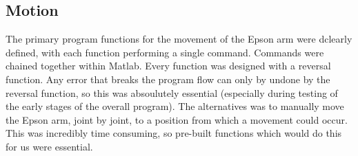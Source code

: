 \subsection{Motion}

The primary program functions for the movement of the Epson arm were dclearly defined, with each function performing a single command. Commands were chained together within Matlab. Every function was designed with a reversal function. Any error that breaks the program flow can only by undone by the reversal function, so this was absoulutely essential (especially during testing of the early stages of the overall program). The alternatives was to manually move the Epson arm, joint by joint, to a position from which a movement could occur. This was incredibly time consuming, so pre-built functions which would do this for us were essential.

